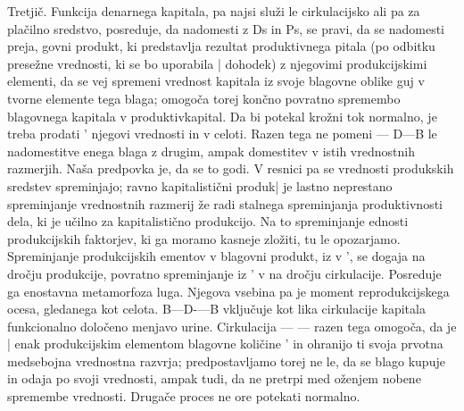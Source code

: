 \documentclass[kapital_02.tex]{subfiles}
\begin{document}
 Tretjič. Funkcija denarnega kapitala, pa najsi služi le cirkulacijsko ali pa za plačilno sredstvo, posreduje, da nadomesti \KPEB z Ds in Ps, se pravi, da se nadomesti preja, govni produkt, ki predstavlja rezultat produktivnega pitala (po odbitku presežne vrednosti, ki se bo uporabila | dohodek) z njegovimi produkcijskimi elementi, da se vej spremeni vrednost kapitala iz svoje blagovne oblike guj v tvorne elemente tega blaga; omogoča torej končno povratno spremembo blagovnega kapitala v produktivkapital. Da bi potekal krožni tok normalno, je treba prodati \KPEB' njegovi vrednosti in v celoti. Razen tega ne pomeni — D—B le nadomestitve enega blaga z drugim, ampak domestitev v istih vrednostnih razmerjih. Naša predpovka je, da se to godi. V resnici pa se vrednosti produkskih sredstev spreminjajo; ravno kapitalistični produk| je lastno neprestano spreminjanje vrednostnih razmerij že radi stalnega spreminjanja produktivnosti dela, ki je učilno za kapitalistično produkcijo. Na to spreminjanje ednosti produkcijskih faktorjev, ki ga moramo kasneje zložiti, tu le opozarjamo. Spreminjanje produkcijskih ementov v blagovni produkt, iz \KPEP v \KPEB', se dogaja na dročju produkcije, povratno spreminjanje iz \KPEB' v \KPEP na dročju cirkulacije. Posreduje ga enostavna metamorfoza luga. Njegova vsebina pa je moment reprodukcijskega ocesa, gledanega kot celota. B—D-—B vključuje kot lika cirkulacije kapitala funkcionalno določeno menjavo urine. Cirkulacija \KPEB — \KPED — \KPEB razen tega omogoča, da je | enak produkcijskim elementom blagovne količine \KPEB' in ohranijo ti svoja prvotna medsebojna vrednostna razvrja; predpostavljamo torej ne le, da se blago kupuje in odaja po svoji vrednosti, ampak tudi, da ne pretrpi med oženjem nobene spremembe vrednosti. Drugače proces ne ore potekati normalno.
\end{document}
